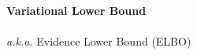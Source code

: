 \documentclass{beamer}
\begin{document}
{%
\begin{frame}
\begin{center}
{\bf\LARGE Variational Lower Bound}\\
~\\
\textit{a.k.a.} Evidence Lower Bound (ELBO)
\end{center}
\end{frame}
}%
\end{document}
